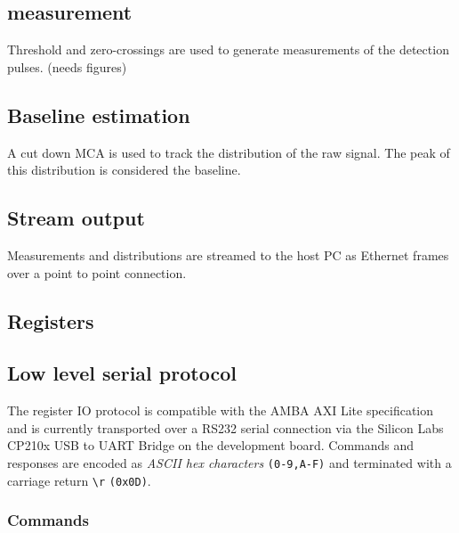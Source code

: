 \documentclass{article}
\newcommand{\code}[1]{\texttt{#1}}
\newcommand{\return}{\code{\textbackslash r}}
\begin{document}
\subsection{measurement}
Threshold and zero-crossings are used to generate measurements of the detection
pulses. (needs figures)
\subsection{Baseline estimation}
A cut down MCA is used to track the distribution of the raw signal. The peak of
this distribution is considered the baseline. 

\subsection{Stream output}
Measurements and distributions are streamed to the host PC as Ethernet frames
over a point to point connection. 

%   
% 
%   
% 
%   

\subsection{Registers}


\subsection{Low level serial protocol}

The register IO protocol is compatible with the AMBA AXI Lite specification and
is currently transported over a RS232 serial connection via the Silicon Labs
CP210x USB to UART Bridge on the development board.
Commands and responses are encoded as \emph{ASCII hex characters}
\code{(0-9,A-F)} and terminated with a carriage return \return{} \code{(0x0D)}.

\subsubsection{Commands}
\end{document}
